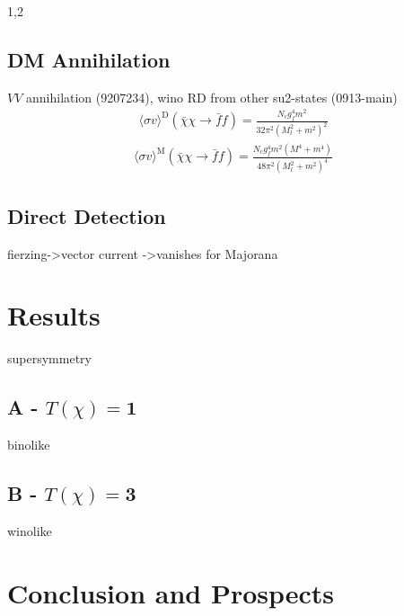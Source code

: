 \documentclass[11pt,a4paper,twoside]{article}
\numberwithin{equation}{section}
\begin{document}
\begin{spacing}{1,2}
\subsection{DM Annihilation}
$VV$ annihilation (9207234), wino RD from other su2-states (0913-main)
\begin{align}
 \langle \sigma v \rangle^\text{D} \left(\bar \chi \chi \rightarrow \bar f f\right) = \frac{N_c g_f^4 m^2}{32\pi^2\left(M_l^2 + m^2\right)^2}
\end{align}
\begin{align}
 \langle \sigma v \rangle^\text{M} \left(\bar \chi \chi \rightarrow \bar f f\right) = \frac{N_c g_f^4 m^2 \left(M^4+m^4 \right)}{48\pi^2\left(M_l^2 + m^2\right)^4}
\end{align}


\subsection{Direct Detection}
fierzing->vector current ->vanishes for Majorana

\section{Results}
supersymmetry
\subsection{A - $T(\chi)=\boldsymbol{1}$}
binolike
\subsection{B - $T(\chi)=\boldsymbol{3}$}
winolike
\section{Conclusion and Prospects}



\end{spacing}
\end{document}
